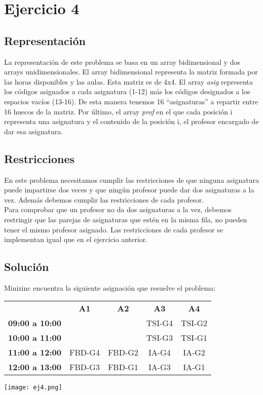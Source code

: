 \section{Ejercicio 4}
\subsection{Representación}
La representación de este problema se basa en un array bidimensional y dos arrays unidimensionales. El array bidimensional representa la matriz formada por las horas disponibles y las aulas. Esta matriz es de 4x4. El array \emph{asig} representa los códigos asignados a cada asignatura (1-12) más los códigos designados a los espacios vacíos (13-16). De esta manera tenemos 16 ``asignaturas'' a repartir entre 16 huecos de la matriz. Por último, el array \emph{prof} en el que cada posición i representa una asignatura y el contenido de la posición i, el profesor encargado de dar esa asignatura.

\subsection{Restricciones}
En este problema necesitamos cumplir las restricciones de que ninguna asignatura puede impartirse dos veces y que ningún profesor puede dar dos asignaturas a la vez. Además debemos cumplir las restricciones de cada profesor.\\
Para comprobar que un profesor no da dos asignaturas a la vez, debemos restringir que las parejas de asignaturas que estén en la misma fila, no pueden tener el mismo profesor asignado. Las restricciones de cada profesor se implementan igual que en el ejercicio anterior.

\subsection{Solución}
Minizinc encuentra la siguiente asignación que resuelve el problema:
\begin{table}[H]
\begin{tabular}{ccccc}
 & \textbf{A1} & \textbf{A2} & \textbf{A3} & \textbf{A4} \\ \cline{2-5}
\multicolumn{1}{c|}{\textbf{09:00 a 10:00}} &  &  & TSI-G4 & TSI-G2 \\
\multicolumn{1}{c|}{\textbf{10:00 a 11:00}} &  &  & TSI-G3 & TSI-G1 \\
\multicolumn{1}{c|}{\textbf{11:00 a 12:00}} & FBD-G4 & FBD-G2 & IA-G4 & IA-G2 \\
\multicolumn{1}{c|}{\textbf{12:00 a 13:00}} & FBD-G3 & FBD-G1 & IA-G3 & IA-G1
\end{tabular}
\end{table}

\texttt{[image: ej4.png]}

